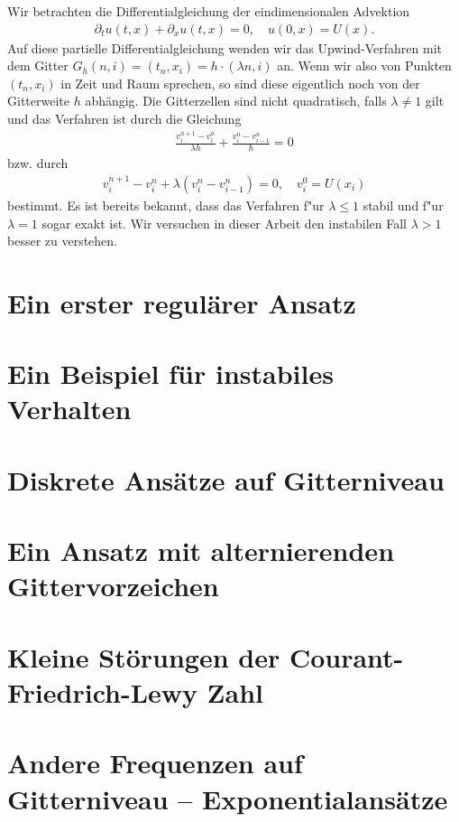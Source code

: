 
Wir betrachten die Differentialgleichung der eindimensionalen Advektion
\begin{align}\label{eq:adv:pde}
\partial_t u(t, x) + \partial_x u(t, x) = 0, \quad u(0, x) = U(x).
\end{align}
Auf diese partielle Differentialgleichung wenden wir das Upwind-Verfahren mit dem Gitter $G_h(n,i) = (t_n, x_i) = h \cdot (\lambda n, i)$ an.
Wenn wir also von Punkten $(t_n, x_i)$ in Zeit und Raum sprechen, so sind diese eigentlich noch von der Gitterweite $h$ abhängig. 
Die Gitterzellen sind nicht quadratisch, falls $\lambda \neq 1$ gilt und das Verfahren ist durch die Gleichung
\begin{align}\label{eq:adv:scheme_rechnung}
\frac {v^{n+1}_i - v^n_i} {\lambda h} + \frac {v^n_i - v^n_{i-1}} h = 0
\end{align}
bzw. durch
\begin{align}\label{eq:adv:scheme}
v^{n+1}_i - v^n_i + \lambda (v^n_i - v^n_{i-1}) = 0, \quad v^0_i = U(x_i)
\end{align}
bestimmt.
Es ist bereits bekannt, dass das Verfahren f"ur $\lambda \leq 1$ stabil und f"ur $\lambda = 1$ sogar exakt ist.
Wir versuchen in dieser Arbeit den instabilen Fall $\lambda > 1$ besser zu verstehen.

\section{Ein erster regulärer Ansatz}\label{sec:regulaer}



\section{Ein Beispiel für instabiles Verhalten}\label{sec:transport:beispiel}



\section {Diskrete Ansätze auf Gitterniveau} \label{sec:transport:diskret}



\section {Ein Ansatz mit alternierenden Gittervorzeichen}\label{sec:transport:osz}



\section{Kleine Störungen der Courant-Friedrich-Lewy Zahl}\label{sec:transport:kleineta}



\section{Andere Frequenzen auf Gitterniveau -- Exponentialansätze}

